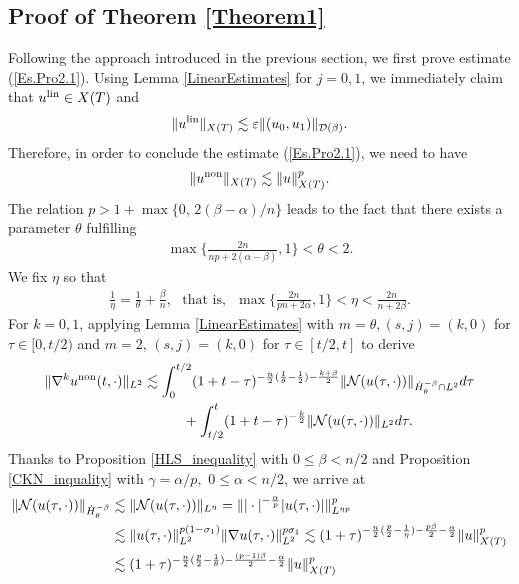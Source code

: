 \documentclass[11pt,reqno]{amsart}
\begin{document}
\subsection{Proof of Theorem \ref{Theorem1}} 
Following the approach introduced in the previous section, we first prove estimate (\ref{Es.Pro2.1}). Using Lemma \ref{LinearEstimates} for $j=0,1$, we immediately claim that $u^{\rm lin} \in X(T)$ and
\begin{align*}
    \|u^{\rm lin}\|_{X(T)} \lesssim \varepsilon \|(u_0, u_1)\|_{\mathcal{D}(\beta)}.
\end{align*}
Therefore, in order to conclude the estimate (\ref{Es.Pro2.1}), we need to have
\begin{align}
    \|u^{\rm non}\|_{X(T)} \lesssim \|u\|_{X(T)}^p. \label{Main.Es2}
\end{align}
   The relation $p > 1+ \max\{0,\, 2(\beta-\alpha)/n\}$ leads to the fact that there exists a parameter $\theta$ fulfilling
   \begin{align*}
       \max\bigg\{\frac{2n}{np + 2(\alpha-\beta)}, 1 \bigg\} <  \theta < 2.
   \end{align*}
   We fix $\eta$ so that
   \begin{align}
      \frac{1}{\eta} = \frac{1}{\theta}+\frac{\beta}{n},  \,\,\text{ that is, }\,\, \max\bigg\{\frac{2n}{pn+2\alpha}, 1\bigg\} < \eta <  \frac{2n}{n+2\beta}.\label{RE1}
   \end{align}
    For $k = 0,1$, applying Lemma \ref{LinearEstimates} with $m = \theta, (s,j)=(k,0)$ for $\tau \in [0, t/2)$ and $m=2$, $(s,j)=(k,0)$ for $\tau \in [t/2, t]$ to derive
    \begin{align*}
        \|\nabla^k u^{\rm non}(t,\cdot)\|_{L^2} &\lesssim \int_0^{t/2} (1+t-\tau)^{-\frac{n}{2}(\frac{1}{\theta}-\frac{1}{2})-\frac{k+\beta}{2}} \|\mathcal{N}(u(\tau,\cdot))\|_{\dot{H}_{\theta}^{-\beta}\cap L^2} d\tau\\
        &\hspace{1cm}+\int_{t/2}^t (1+t-\tau)^{-\frac{k}{2}} \|\mathcal{N}(u(\tau,\cdot))\|_{L^2} d\tau.
    \end{align*}
    Thanks to Proposition \ref{HLS_inequality} with $0 \leq \beta < n/2$ and Proposition \ref{CKN_inquality} with $\gamma = \alpha/p,\,\, 0 \leq \alpha < n/2$, we arrive at
    \begin{align}
        \|\mathcal{N}(u(\tau,\cdot))\|_{\dot{H}_{\theta}^{-\beta}} &\lesssim \|\mathcal{N}(u(\tau,\cdot))\|_{L^{\eta}} = \||\cdot|^{-\frac{\alpha}{p}} |u(\tau,\cdot)|\|_{L^{\eta p}}^p \notag\\
        &\lesssim \|u(\tau,\cdot)\|_{L^2}^{p(1-\sigma_1)} \|\nabla u(\tau,\cdot)\|_{L^2}^{p\sigma_1} \lesssim (1+\tau)^{-\frac{n}{2}(\frac{p}{2}-\frac{1}{\eta})-\frac{p\beta}{2}-\frac{\alpha}{2}} \|u\|_{X(T)}^p\notag\\
        &\lesssim (1+\tau)^{-\frac{n}{2}(\frac{p}{2}-\frac{1}{\theta})-\frac{(p-1)\beta}{2}-\frac{\alpha}{2}} \|u\|_{X(T)}^p \notag
    \end{align}
\end{document}
